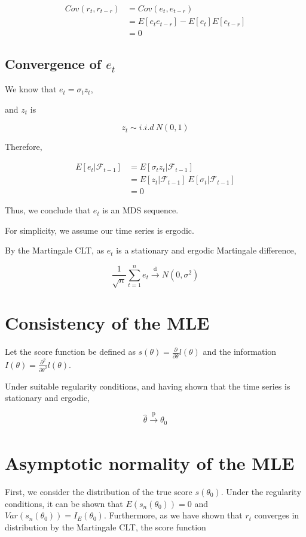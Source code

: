 \documentclass{article}
\begin{document}
\[
\begin{split}
Cov(r_t, r_{t-r}) &= Cov(e_t, e_{t-r}) \\ 
        &= E[e_t e_{t-r}] -E[e_t] E[e_{t-r}] \\ 
        &= 0
\end{split}
\]

\subsection{Convergence of $e_t$}

We know that $e_t = \sigma_t z_t$,

and $z_t$ is

\[
z_t  \sim i.i.d \ N(0, 1)
\]

Therefore,

\[
\begin{split}
    E[e_{t}| \mathcal{F}_{t-1}] &= E[\sigma_t z_t| \mathcal{F}_{t-1}] \\
    &= E[z_{t}| \mathcal{F}_{t-1}] \ E[\sigma_t| \mathcal{F}_{t-1}] \\
    &= 0
\end{split}
\]

Thus, we conclude that $e_t$ is an MDS sequence.

For simplicity, we assume our time series is ergodic.

By the Martingale CLT, as $e_t$ is a stationary and ergodic Martingale difference,

\[
\frac{1}{\sqrt{n}} \sum_{t=1}^n e_t \xrightarrow[]{\text{d}} N(0, \sigma^2)
\]


\section{Consistency of the MLE}

Let the score function be defined as $s(\theta) = \frac{\partial}{\partial\theta} l(\theta)$ and the information $I(\theta) = \frac{\partial^2}{\partial\theta^2} l(\theta)$. 

Under suitable regularity conditions, and having shown that the time series is stationary and ergodic,

\[
\hat{\theta} \xrightarrow[]{\text{p}} \theta_0
\]


\section{Asymptotic normality of the MLE}

First, we consider the distribution of the true score $s(\theta_0)$. Under the regularity conditions, it can be shown that $E(s_n(\theta_0)) = 0$ and $Var(s_n(\theta_0)) = I_E(\theta_0)$. Furthermore, as we have shown that $r_t$ converges in distribution by the Martingale CLT, the score function
\end{document}
